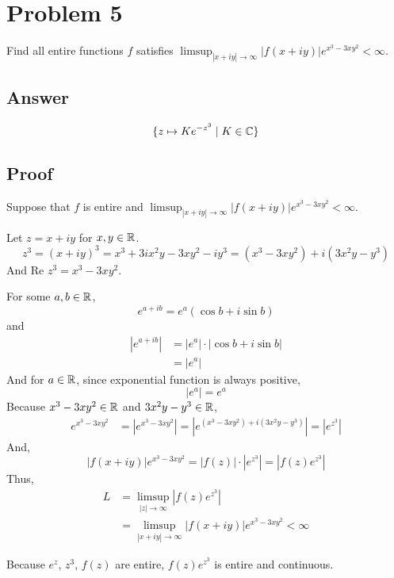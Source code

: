 \section*{Problem 5}

Find all entire functions \(f\) satisfies \(\limsup_{\left| x + iy \right| \to \infty} \left|f(x + iy) \right| e^{x^3 - 3xy^2} < \infty\).

\subsection*{Answer}

\[\{z \mapsto K e^{-z^3} \mid K \in \mathbb{C}\}\]

\subsection*{Proof}

Suppose that \(f\) is entire and \(\limsup_{\left| x + iy \right| \to \infty} \left|f(x + iy) \right| e^{x^3 - 3xy^2} < \infty\).

Let \(z = x + iy\) for \(x, y \in \mathbb{R}\).
\[z^3 = (x + iy)^3 = x^3 + 3ix^2y - 3xy^2 - iy^3 = (x^3 - 3xy^2) + i(3x^2y - y^3)\]
And \(\text{Re } z^3 = x^3 - 3xy^2\).

For some \(a, b \in \mathbb{R}\),
\[e^{a + ib} = e^a (\cos b + i \sin b)\]
and
\begin{align*}
  \left| e^{a + ib} \right|
  &= \left| e^a \right| \cdot \left| \cos b + i \sin b \right |
  \\&= |e^a|
\end{align*}
And for \(a \in \mathbb{R}\), since exponential function is always positive,
\[\left| e^a \right| = e^a\]
Because \(x^3 - 3xy^2 \in \mathbb{R}\) and \(3x^2y - y^3 \in \mathbb{R}\),
\begin{align*}
  e^{x^3 - 3xy^2}
  &= \left| e^{x^3 - 3xy^2} \right|
  = \left| e^{(x^3 - 3xy^2) + i(3x^2y - y^3)} \right|
  = \left| e^{z^3} \right|
\end{align*}
And,
\[ \left| f(x + iy) \right| e^{x^3 - 3xy^2}
  = \left| f(z) \right| \cdot \left| e^{z^3} \right|
  = \left| f(z) e^{z^3} \right|
  \]
Thus,
\begin{align*}
  L 
  &= \limsup_{\left| z \right| \to \infty} \left| f(z) e^{z^3} \right|
  \\&= \limsup_{\left| x + iy \right| \to \infty} \left|f(x + iy) \right| e^{x^3 - 3xy^2}
  < \infty
\end{align*}

Because \(e^z\), \(z^3\), \(f(z)\) are entire, \(f(z) e^{z^3}\) is entire and continuous.

